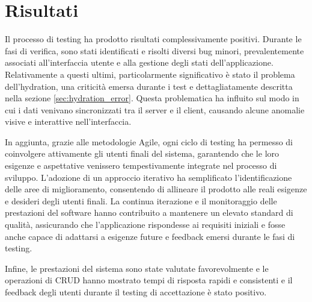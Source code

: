 \documentclass[target=bach,aauheader=,style=]{thud}
\begin{document}
\section{Risultati}
Il processo di testing ha prodotto risultati complessivamente positivi. Durante le fasi di verifica, sono stati identificati e risolti diversi bug minori, prevalentemente associati all'interfaccia utente e alla gestione degli stati dell'applicazione. Relativamente a questi ultimi, particolarmente significativo è stato il problema dell'hydration, una criticità emersa durante i test e dettagliatamente descritta nella sezione \ref{sec:hydration_error}. Questa problematica ha influito sul modo in cui i dati venivano sincronizzati tra il server e il client, causando alcune anomalie visive e interattive nell'interfaccia.

\noindent In aggiunta, grazie alle metodologie Agile, ogni ciclo di testing ha permesso di coinvolgere attivamente gli utenti finali del sistema, garantendo che le loro esigenze e aspettative venissero tempestivamente integrate nel processo di sviluppo. L'adozione di un approccio iterativo ha semplificato l'identificazione delle aree di miglioramento, consentendo di allineare il prodotto alle reali esigenze e desideri degli utenti finali. La continua iterazione e il monitoraggio delle prestazioni del software hanno contribuito a mantenere un elevato standard di qualità, assicurando che l'applicazione rispondesse ai requisiti iniziali e fosse anche capace di adattarsi a esigenze future e feedback emersi durante le fasi di testing.

\noindent Infine, le prestazioni del sistema sono state valutate favorevolmente e le operazioni di CRUD hanno mostrato tempi di risposta rapidi e consistenti e il feedback degli utenti durante il testing di accettazione è stato positivo.
\end{document}
